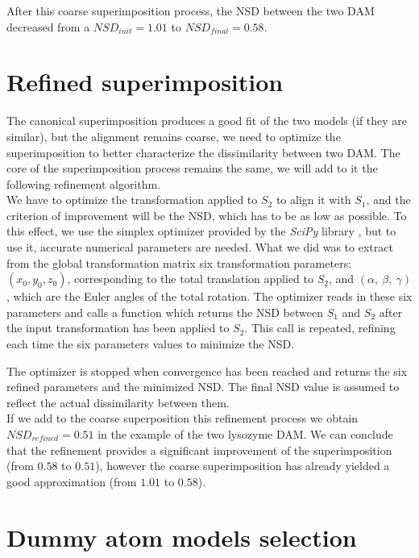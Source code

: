 \documentclass[a4paper, 11pt]{report}
\begin{document}
After this coarse superimposition process, the NSD between the two DAM 
decreased from a $NSD_{init} = 1.01$ to $NSD_{final} = 0.58$. 

\section{Refined superimposition}

The canonical superimposition produces a good fit of the two models 
(if they are similar), but the alignment remains coarse, we need to 
optimize the superimposition to better characterize the dissimilarity 
between two DAM. 
The core of the superimposition process remains the same, we will add 
to it the following refinement algorithm.\\
 
We have to optimize the transformation applied to $S_{2}$ to align it 
with $S_{1}$, and the criterion of improvement will be the NSD, which 
has to be as low as possible. 
To this effect, we use the simplex optimizer provided by the 
\textit{SciPy} library \cite{scipy}, but to use it, accurate numerical 
parameters are needed. 
What we did was to extract from the global transformation matrix 
six transformation parameters: 
$(x_{0}, y_{0}, z_{0})$, 
corresponding to the total translation applied to $S_{2}$, and 
$(\alpha,\ \beta,\ \gamma)$, 
which are the Euler angles of the total rotation. 
The optimizer reads in these six parameters and calls a function which 
returns the NSD between $S_{1}$ and $S_{2}$ after the input 
transformation has been applied to $S_{2}$. 
This call is repeated, refining each time the six parameters values to 
minimize the NSD.

The optimizer is stopped when convergence has been reached and returns 
the six refined parameters and the minimized NSD. 
The final NSD value is assumed to reflect the actual dissimilarity 
between them.\\

If we add to the coarse superposition this refinement process we 
obtain $NSD_{refined} = 0.51$ in the example of the two lysozyme DAM. 
We can conclude that the refinement provides a significant improvement 
of the superimposition (from $0.58$ to $0.51$), however the coarse 
superimposition has already yielded a good approximation (from $1.01$ 
to $0.58$).

\section{Dummy atom models selection}
\end{document}
